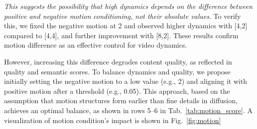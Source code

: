 \textit{This suggests the possibility that high dynamics depends on the difference between positive and negative motion conditioning, not their absolute values}. To verify this, we fixed the negative motion at 2 and observed higher dynamics with [4,2] compared to [4,4], and further improvement with [8,2]. These results confirm motion difference as an effective control for video dynamics.

However, increasing this difference degrades content quality, as reflected in quality and semantic scores. To balance dynamics and quality, we propose initially setting the negative motion to a low value (e.g., 2) and aligning it with positive motion after a threshold (e.g., 0.05). This approach, based on the assumption that motion structures form earlier than fine details in diffusion, achieves an optimal balance, as shown in rows 5–6 in Tab.~\ref{tab:motion_score}. A visualization of motion condition's impact is shown in Fig.~\ref{fig:motion}
